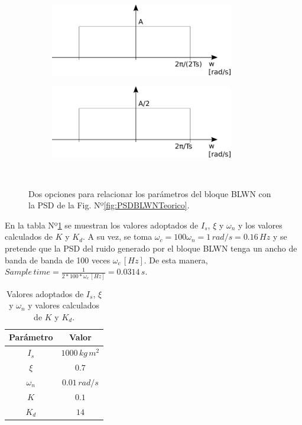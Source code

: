 \documentclass[a4paper,11pt,twoside]{IT-CNEA}
\begin{document}
\begin{figure}[t!]
    \centering
    \begin{subfigure}[t]{0.5\textwidth}
        \centering
        \includegraphics[width=8cm]{Figuras/PSDBLWNTeoricoOpcion1.png}
        \caption{}
        \label{fig:PSDBLWNTeoricoOpcion1}
    \end{subfigure}%
    \begin{subfigure}[t]{0.5\textwidth}
        \centering
        \includegraphics[width=8cm]{Figuras/PSDBLWNTeoricoOpcion2.png}
        \caption{}
        \label{fig:PSDBLWNTeoricoOpcion2}
    \end{subfigure}%
    ~ 
    \caption{Dos opciones para relacionar los parámetros del bloque BLWN con la PSD de la Fig. Nº\ref{fig:PSDBLWNTeorico}.}
    \label{}
\end{figure}
\par En la tabla Nº\ref{tabla:parametros} se muestran los valores adoptados de $I_s$, $\xi$ y $\omega_n$ y los valores calculados de $K$ y $K_d$. A su vez, se toma $\omega_c=100\omega_n=1\,rad/s=0.16\,Hz$ y se pretende que la PSD del ruido generado por el bloque BLWN tenga un ancho de banda de banda de 100 veces $\omega_c\,[Hz]$. De esta manera, $Sample\,time=\frac{1}{2*100*\omega_c\,[Hz]}=0.0314\,s$.
\begin{table}[h!]
\centering
\caption{Valores adoptados de $I_s$, $\xi$ y $\omega_n$ y valores calculados de $K$ y $K_d$.}
\label{tabla:parametros}
\begin{tabular}{|c|c|}
\hline
Parámetro & Valor \\ \hline
$I_s$ & $1000\,kg\,m^2$  \\ \hline
$\xi$ & $0.7$  \\ \hline
$\omega_n$ & $0.01\,rad/s$ \\ \hline
$K$ & $0.1$ \\ \hline
$K_d$ & $14$ \\ \hline
\end{tabular}
\end{table}
\end{document}
